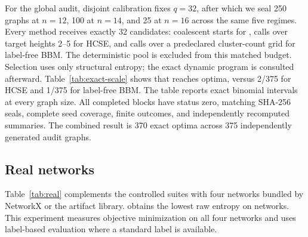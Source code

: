 

For the global audit, disjoint calibration fixes $q=32$, after which we seal
250 graphs at $n=12$, 100 at $n=14$, and 25 at $n=16$ across the same five
regimes. Every method receives exactly 32 candidates: coalescent starts for
\NEST, calls over target heights 2--5 for HCSE, and calls over a predeclared
cluster-count grid for label-free BBM. The deterministic \NEST pool is excluded
from this matched budget. Selection uses only structural entropy; the exact
dynamic program is consulted afterward.
Table~\ref{tab:exact-scale} shows that \NEST reaches \ScaleCombinedExact{}
optima, versus 2/375 for HCSE and 1/375 for label-free BBM. The table reports
exact binomial intervals at every graph size. All completed blocks have status
zero, matching SHA-256 seals, complete seed coverage, finite outcomes, and
independently recomputed summaries. The combined result is 370 exact optima
across 375 independently generated audit graphs.



\subsection{Real networks}
Table~\ref{tab:real} complements the controlled suites with four networks
bundled by NetworkX or the artifact library. \NEST obtains the lowest raw
entropy on \RealWins networks. This experiment measures objective minimization
on all four networks and uses label-based evaluation where a standard label is
available.


